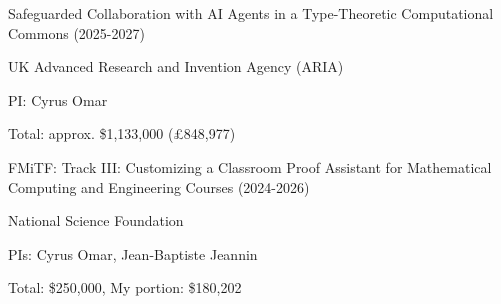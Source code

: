 \documentclass[10pt,letterpaper]{article}
\renewenvironment{itemize}{
  \begin{list}{}{
    \setlength{\leftmargin}{1.25em}
    \setlength{\itemsep}{0.25em}
    \setlength{\parskip}{0pt}
    \setlength{\parsep}{0.2em}
  }
}{
  \end{list}
}
\begin{document}
\begin{itemize}
  \item Safeguarded Collaboration with AI Agents in a Type-Theoretic Computational Commons  (2025-2027)
    \begin{itemize}
      \item UK Advanced Research and Invention Agency (ARIA)
      \item PI: Cyrus Omar
      \item Total: approx. \$1,133,000 (\pounds 848,977)
    \end{itemize}
  \item FMiTF: Track III: Customizing a Classroom Proof Assistant for Mathematical Computing and Engineering Courses (2024-2026)
    \begin{itemize}
      \item National Science Foundation
      \item PIs: Cyrus Omar, Jean-Baptiste Jeannin
      \item Total: \$250,000, My portion: \$180,202
    \end{itemize}

\end{itemize}
\end{document}

